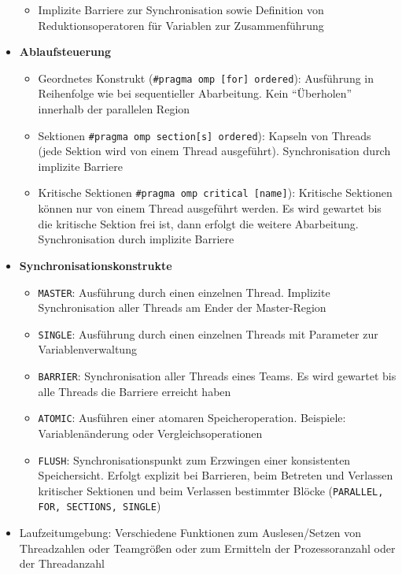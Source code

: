 \begin{itemize}
\begin{itemize}
		\item Implizite Barriere zur Synchronisation sowie Definition von Reduktionsoperatoren für Variablen zur Zusammenführung
	\end{itemize}
	\item \textbf{Ablaufsteuerung} %
	\begin{itemize}
		\item Geordnetes Konstrukt (\texttt{\#pragma omp [for] ordered}): Ausführung in Reihenfolge wie bei sequentieller Abarbeitung. Kein "`Überholen"' innerhalb der parallelen Region
		\item Sektionen \texttt{\#pragma omp section[s] ordered}): Kapseln von Threads (jede Sektion wird von einem Thread ausgeführt). Synchronisation durch implizite Barriere
		\item Kritische Sektionen \texttt{\#pragma omp critical [name]}): Kritische Sektionen können nur von einem Thread ausgeführt werden. Es wird gewartet bis die kritische Sektion frei ist, dann erfolgt die weitere Abarbeitung. Synchronisation durch implizite Barriere
	\end{itemize}
	\item \textbf{Synchronisationskonstrukte} %
	\begin{itemize}
		\item \texttt{MASTER}: Ausführung durch einen einzelnen Thread. Implizite Synchronisation aller Threads am Ender der Master-Region
		\item \texttt{SINGLE}: Ausführung durch einen einzelnen Threads mit Parameter zur Variablenverwaltung
		\item \texttt{BARRIER}: Synchronisation aller Threads eines Teams. Es wird gewartet bis alle Threads die Barriere erreicht haben
		\item \texttt{ATOMIC}: Ausführen einer atomaren Speicheroperation. Beispiele: Variablenänderung oder Vergleichsoperationen
		\item \texttt{FLUSH}: Synchronisationspunkt zum Erzwingen einer konsistenten Speichersicht. Erfolgt explizit bei Barrieren, beim Betreten und Verlassen kritischer Sektionen und beim Verlassen bestimmter Blöcke (\texttt{PARALLEL, FOR, SECTIONS, SINGLE})
	\end{itemize}
	\item Laufzeitumgebung: Verschiedene Funktionen zum Auslesen/Setzen von Threadzahlen oder Teamgrößen oder zum Ermitteln der Prozessoranzahl oder der Threadanzahl
\end{itemize}


